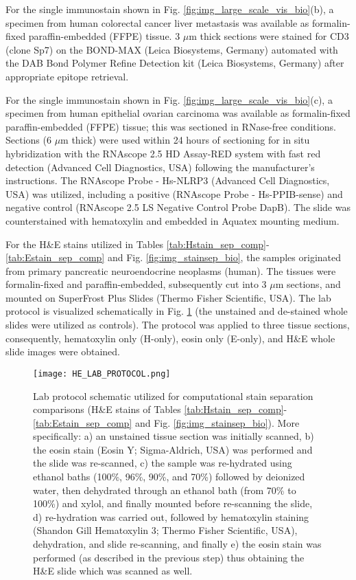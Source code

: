 \documentclass[superscriptaddress,longbibliography,aps,prl,twocolumn,10pt]{revtex4-2}
\begin{document}
For the single immunostain shown in Fig. \ref{fig:img_large_scale_vis_bio}(b), a specimen from human colorectal cancer liver metastasis was available as formalin-fixed paraffin-embedded (FFPE) tissue. 3 $\mu$m thick sections were stained for CD3 (clone Sp7) on the BOND-MAX (Leica Biosystems, Germany) automated with the DAB Bond Polymer Refine Detection kit (Leica Biosystems, Germany) after appropriate epitope retrieval.

For the single immunostain shown in Fig. \ref{fig:img_large_scale_vis_bio}(c), a specimen from human epithelial ovarian carcinoma was available as formalin-fixed paraffin-embedded (FFPE) tissue; this was sectioned in RNase-free conditions. Sections (6 $\mu$m thick) were used within 24 hours of sectioning for in situ hybridization with the RNAscope 2.5 HD Assay-RED system with fast red detection (Advanced Cell Diagnostics, USA) following the manufacturer’s instructions. The RNAscope Probe - Hs-NLRP3 (Advanced Cell Diagnostics, USA) was utilized, including a positive (RNAscope Probe - Hs-PPIB-sense) and negative control (RNAscope 2.5 LS Negative Control Probe DapB). The slide was counterstained with hematoxylin and embedded in Aquatex mounting medium.

For the H\&E stains utilized in Tables \ref{tab:Hstain_sep_comp}-\ref{tab:Estain_sep_comp} and Fig. \ref{fig:img_stainsep_bio}, the samples originated from primary pancreatic neuroendocrine neoplasms (human). The tissues were formalin-fixed and paraffin-embedded, subsequently cut into 3 $\mu$m sections, and mounted on SuperFrost Plus Slides (Thermo Fisher Scientific, USA). The lab protocol \cite{Tadrous2010, McCann2014} is visualized schematically in Fig. \ref{fig:h_e_he_protocol} (the unstained and de-stained whole slides were utilized as controls). The protocol was applied to three tissue sections, consequently, hematoxylin only (H-only), eosin only (E-only), and H\&E whole slide images were obtained.

\begin{figure}[t]
\centering
\texttt{[image: HE\_LAB\_PROTOCOL.png]}
\vspace{-12pt}
\caption{\footnotesize{Lab protocol schematic utilized for computational stain separation comparisons (H\&E stains of Tables \ref{tab:Hstain_sep_comp}-\ref{tab:Estain_sep_comp} and Fig. \ref{fig:img_stainsep_bio}). More specifically: a) an unstained tissue section was initially scanned, b) the eosin stain (Eosin Y; Sigma-Aldrich, USA) was performed and the slide was re-scanned, c) the sample was re-hydrated using ethanol baths (100\%, 96\%, 90\%, and 70\%) followed by deionized water, then dehydrated through an ethanol bath (from 70\% to 100\%) and xylol, and finally mounted before re-scanning the slide, d) re-hydration was carried out, followed by hematoxylin staining (Shandon Gill Hematoxylin 3; Thermo Fisher Scientific, USA), dehydration, and slide re-scanning, and finally e) the eosin stain was performed (as described in the previous step) thus obtaining the H\&E slide which was scanned as well.}}
\label{fig:h_e_he_protocol}
\end{figure}
\end{document}

